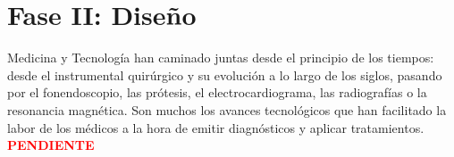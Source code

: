 \chapter {Fase II: Diseño}
\label{cap:Fase II.Diseño}

Medicina y Tecnología han caminado juntas desde el principio de los tiempos: desde el instrumental quirúrgico y su evolución a lo largo de los siglos, pasando por el fonendoscopio, las prótesis, el electrocardiograma, las radiografías o la resonancia magnética. Son muchos los avances tecnológicos que han facilitado la labor de los médicos a la hora de emitir diagnósticos y aplicar tratamientos.
\textbf{\textcolor{red}{\huge PENDIENTE}}